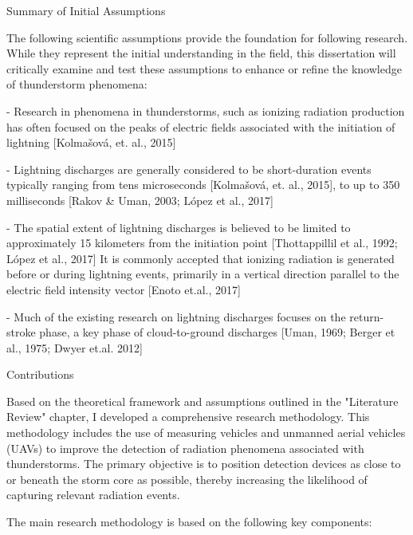 \secc Summary of Initial Assumptions

The following scientific assumptions provide the foundation for following research. While they represent the initial understanding in the field, this dissertation will critically examine and test these assumptions to enhance or refine the knowledge of thunderstorm phenomena:

\begitems
\item - Research in phenomena in thunderstorms, such as ionizing radiation production has often focused on the peaks of electric fields associated with the initiation of lightning [Kolmašová, et. al., 2015]
\item - Lightning discharges are generally considered to be short-duration events  typically ranging from tens microseconds [Kolmašová, et. al., 2015], to up to 350 milliseconds [Rakov \& Uman, 2003; López et al., 2017]
\item - The spatial extent of lightning discharges is believed to be limited to approximately 15 kilometers from the initiation point [Thottappillil et al., 1992; López et al., 2017]
It is commonly accepted that ionizing radiation is generated before or during lightning events, primarily in a vertical direction parallel to the electric field intensity vector  [Enoto et.al., 2017]
\item - Much of the existing research on lightning discharges focuses on the return-stroke phase, a key phase of cloud-to-ground discharges [Uman, 1969; Berger et al., 1975; Dwyer et.al. 2012]
\enditems

\sec Contributions

Based on the theoretical framework and assumptions outlined in the "Literature Review" chapter, I developed a comprehensive research methodology. This methodology includes the use of measuring vehicles and unmanned aerial vehicles (UAVs) to improve the detection of radiation phenomena associated with thunderstorms. The primary objective is to position detection devices as close to or beneath the storm core as possible, thereby increasing the likelihood of capturing relevant radiation events.

The main research methodology is based on the following key components:

